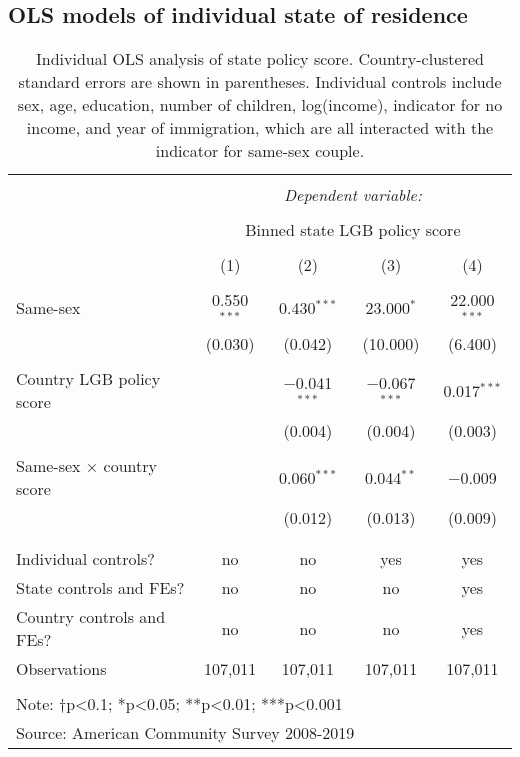 \documentclass[
  11pt,
]{article}
\begin{document}
\newpage

\hypertarget{ols-models-of-individual-state-of-residence}{%
\subsection{OLS models of individual state of residence}\label{ols-models-of-individual-state-of-residence}}

\begin{table}[!htbp] \centering 
  \caption{Individual OLS analysis of state policy score. Country-clustered standard errors are shown in parentheses. Individual controls include sex, age, education, number of children, log(income), indicator for no income, and year of immigration, which are all interacted with the indicator for same-sex couple.} 
  \label{tab:ols} 
\begin{tabular}{@{\extracolsep{5pt}}lcccc} 
\\[-1.8ex]\hline 
\hline \\[-1.8ex] 
 & \multicolumn{4}{c}{\textit{Dependent variable:}} \\ 
\cline{2-5} 
\\[-1.8ex] & \multicolumn{4}{c}{Binned state LGB policy score} \\ 
\\[-1.8ex] & (1) & (2) & (3) & (4)\\ 
\hline \\[-1.8ex] 
 Same-sex & 0.550$^{***}$ & 0.430$^{***}$ & 23.000$^{*}$ & 22.000$^{***}$ \\ 
  & (0.030) & (0.042) & (10.000) & (6.400) \\ 
  & & & & \\ 
 Country LGB policy score &  & $-$0.041$^{***}$ & $-$0.067$^{***}$ & 0.017$^{***}$ \\ 
  &  & (0.004) & (0.004) & (0.003) \\ 
  & & & & \\ 
 Same-sex × country score &  & 0.060$^{***}$ & 0.044$^{**}$ & $-$0.009 \\ 
  &  & (0.012) & (0.013) & (0.009) \\ 
  & & & & \\ 
\hline \\[-1.8ex] 
Individual controls? & no & no & yes & yes \\ 
State controls and FEs? & no & no & no & yes \\ 
Country controls and FEs? & no & no & no & yes \\ 
Observations & 107,011 & 107,011 & 107,011 & 107,011 \\ 
\hline 
\hline \\[-1.8ex] 
\multicolumn{5}{l}{Note: †p<0.1; *p<0.05; **p<0.01; ***p<0.001} \\ 
\multicolumn{5}{l}{Source: American Community Survey 2008-2019} \\ 
\end{tabular} 
\end{table}
\end{document}
